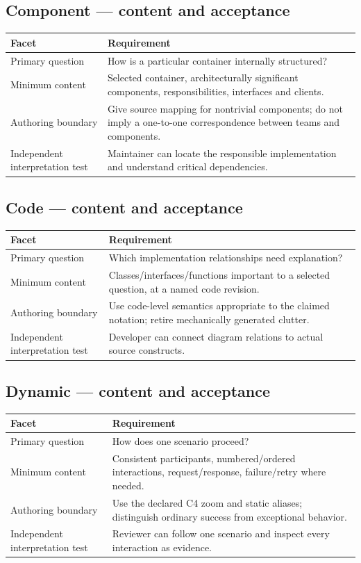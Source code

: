 \documentclass[10pt,letterpaper]{article}
\begin{document}
\subsection{Component — content and acceptance}
\begin{tabularx}{\linewidth}{@{}YY@{}}\toprule
\textbf{Facet} & \textbf{Requirement} \\ \midrule
Primary question & How is a particular container internally structured? \\
Minimum content & Selected container, architecturally significant components, responsibilities, interfaces and clients. \\
Authoring boundary & Give source mapping for nontrivial components; do not imply a one-to-one correspondence between teams and components. \\
Independent interpretation test & Maintainer can locate the responsible implementation and understand critical dependencies. \\
\bottomrule\end{tabularx}

\subsection{Code — content and acceptance}
\begin{tabularx}{\linewidth}{@{}YY@{}}\toprule
\textbf{Facet} & \textbf{Requirement} \\ \midrule
Primary question & Which implementation relationships need explanation? \\
Minimum content & Classes/interfaces/functions important to a selected question, at a named code revision. \\
Authoring boundary & Use code-level semantics appropriate to the claimed notation; retire mechanically generated clutter. \\
Independent interpretation test & Developer can connect diagram relations to actual source constructs. \\
\bottomrule\end{tabularx}

\subsection{Dynamic — content and acceptance}
\begin{tabularx}{\linewidth}{@{}YY@{}}\toprule
\textbf{Facet} & \textbf{Requirement} \\ \midrule
Primary question & How does one scenario proceed? \\
Minimum content & Consistent participants, numbered/ordered interactions, request/response, failure/retry where needed. \\
Authoring boundary & Use the declared C4 zoom and static aliases; distinguish ordinary success from exceptional behavior. \\
Independent interpretation test & Reviewer can follow one scenario and inspect every interaction as evidence. \\
\bottomrule\end{tabularx}
\end{document}
